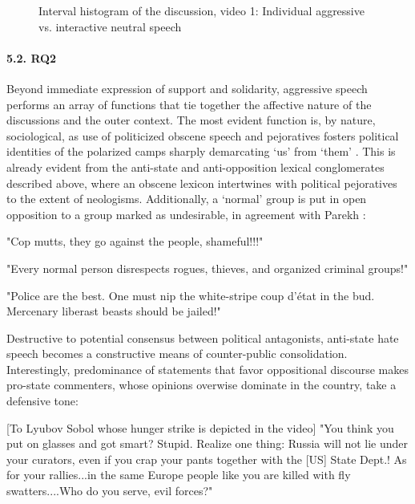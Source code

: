 \begin{figure}[ht]
	\caption{Interval histogram of the discussion, video 1: Individual aggressive vs. interactive neutral speech}\label{fig:video1Histogram}
\end{figure}

\paragraph{5.2. RQ2}
Beyond immediate expression of support and solidarity, aggressive speech performs an array of functions that tie together the affective nature of the discussions and the outer context. The most evident function is, by nature, sociological, as use of politicized obscene speech and pejoratives fosters political identities of the polarized camps sharply demarcating ‘us’ from ‘them’ \cite{VanDijk}. This is already evident from the anti-state and anti-opposition lexical conglomerates described above, where an obscene lexicon intertwines with political pejoratives to the extent of neologisms. Additionally, a ‘normal’ group is put in open opposition to a group marked as undesirable, in agreement with Parekh \cite{Parekh}:

\hspace{\parindent}"Cop mutts, they go against the people, shameful!!!"

\hspace{\parindent}"Every normal person disrespects rogues, thieves, and organized criminal groups!"

\hspace{\parindent}"Police are the best. One must nip the white-stripe coup d’état in the bud. Mercenary liberast beasts should be jailed!"

Destructive to potential consensus between political antagonists, anti-state hate speech becomes a constructive means of counter-public consolidation. Interestingly, predominance of statements that favor oppositional discourse makes pro-state commenters, whose opinions overwise dominate in the country, take a defensive tone:

\hspace{\parindent}[To Lyubov Sobol whose hunger strike is depicted in the video] "You think you put on glasses and got smart? Stupid. Realize one thing: Russia will not lie under your curators, even if you crap your pants together with the [US] State Dept.! As for your rallies...in the same Europe people like you are killed with fly swatters....Who do you serve, evil forces?"

